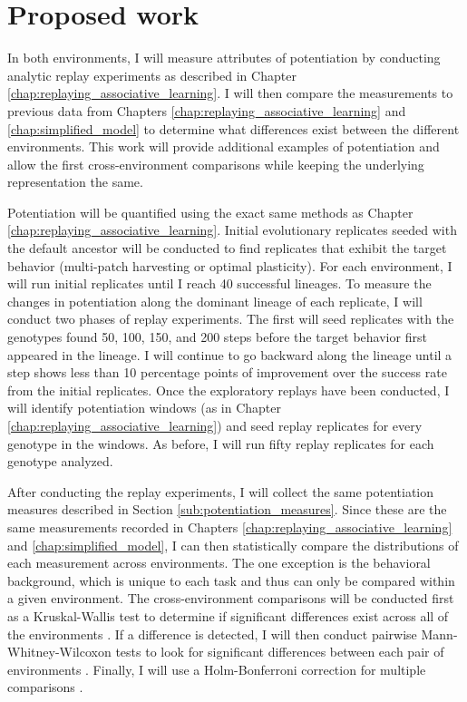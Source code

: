 \section{Proposed work}

In both environments, I will measure attributes of potentiation by conducting analytic replay experiments as described in Chapter \ref{chap:replaying_associative_learning}. 
I will then compare the measurements to previous data from Chapters \ref{chap:replaying_associative_learning} and \ref{chap:simplified_model} to determine what differences exist between the different environments. 
This work will provide additional examples of potentiation and allow the first cross-environment comparisons while keeping the underlying representation the same. 

Potentiation will be quantified using the exact same methods as Chapter \ref{chap:replaying_associative_learning}. 
Initial evolutionary replicates seeded with the default ancestor will be conducted to find replicates that exhibit the target behavior (multi-patch harvesting or optimal plasticity). 
For each environment, I will run initial replicates until I reach 40 successful lineages. 
To measure the changes in potentiation along the dominant lineage of each replicate, I will conduct two phases of replay experiments. 
The first will seed replicates with the genotypes found 50, 100, 150, and 200 steps before the target behavior first appeared in the lineage. 
I will continue to go backward along the lineage until a step shows less than 10 percentage points of improvement over the success rate from the initial replicates.
Once the exploratory replays have been conducted, I will identify potentiation windows (as in Chapter \ref{chap:replaying_associative_learning}) and seed replay replicates for every genotype in the windows. 
As before, I will run fifty replay replicates for each genotype analyzed. 

After conducting the replay experiments, I will collect the same potentiation measures described in Section \ref{sub:potentiation_measures}.
Since these are the same measurements recorded in Chapters \ref{chap:replaying_associative_learning} and \ref{chap:simplified_model}, I can then statistically compare the distributions of each measurement across environments. 
The one exception is the behavioral background, which is unique to each task and thus can only be compared within a given environment. 
The cross-environment comparisons will be conducted first as a Kruskal-Wallis test to determine if significant differences exist across all of the environments \citep{kruskal_use_1952}. 
If a difference is detected, I will then conduct pairwise Mann-Whitney-Wilcoxon tests to look for significant differences between each pair of environments \citep{10.2307/3001968}. 
Finally, I will use a Holm-Bonferroni correction for multiple comparisons \citep{holmSimpleSequentiallyRejective1979}.

